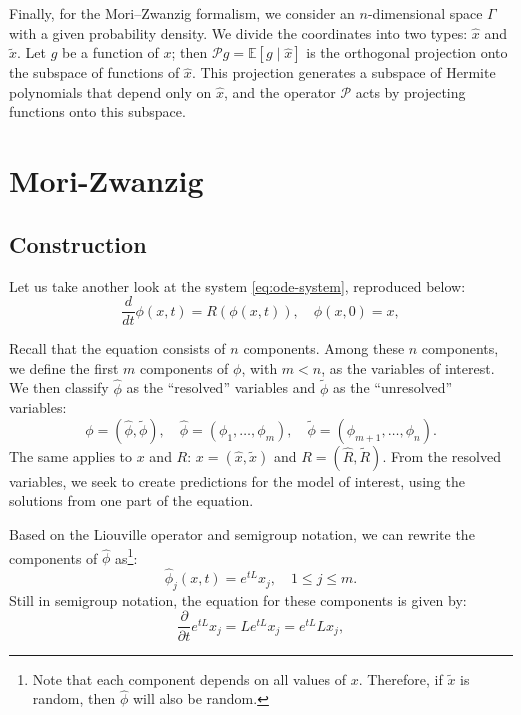 \documentclass[12pt]{article}
\begin{document}
Finally, for the Mori–Zwanzig formalism, we consider an $n$-dimensional space $\Gamma$ with a given probability density. We divide the coordinates into two types: $\hat{x}$ and $\tilde{x}$. Let $g$ be a function of $x$; then $\mathcal{P}g = \mathbb{E}[g \mid \hat{x}]$ is the orthogonal projection onto the subspace of functions of $\hat{x}$. This projection generates a subspace of Hermite polynomials that depend only on $\hat{x}$, and the operator $\mathcal{P}$ acts by projecting functions onto this subspace.

\newpage
\section{Mori-Zwanzig}
\subsection{Construction}
Let us take another look at the system \eqref{eq:ode-system}, reproduced below:
\begin{equation*}
	\frac{d}{dt} \phi(x,t) = R(\phi(x,t)), \quad \phi(x, 0) = x,
\end{equation*}

Recall that the equation consists of $n$ components. Among these $n$ components, we define the first $m$ components of $\phi$, with $m < n$, as the variables of interest. We then classify $\hat{\phi}$ as the ``resolved'' variables and $\tilde{\phi}$ as the ``unresolved'' variables:
\begin{equation*}
	\phi = (\hat{\phi}, \tilde{\phi}), \quad \hat{\phi} = \left(\phi_1, \ldots, \phi_m \right), \quad \tilde{\phi} = \left(\phi_{m+1}, \ldots, \phi_n\right).
\end{equation*}
The same applies to $x$ and $R$: $x = (\hat{x}, \tilde{x})$ and $R = (\hat{R}, \tilde{R})$. From the resolved variables, we seek to create predictions for the model of interest, using the solutions from one part of the equation.

Based on the Liouville operator and semigroup notation, we can rewrite the components of $\hat{\phi}$ as\footnote{Note that each component depends on all values of $x$. Therefore, if $\tilde{x}$ is random, then $\hat{\phi}$ will also be random.}:
\begin{equation*}
	\hat{\phi}_j(x,t) = e^{tL}x_j, \quad 1 \leq j \leq m.
\end{equation*}
Still in semigroup notation, the equation for these components is given by:
\begin{equation}
	\frac{\partial}{\partial t}e^{tL}x_j = Le^{tL}x_j = e^{tL}Lx_j,
	\label{eq:mori-zwanzig-semigroup}
\end{equation}
\end{document}
